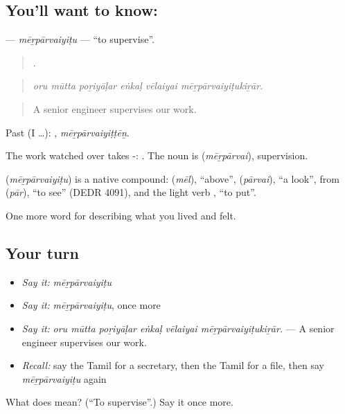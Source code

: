 \subsection*{You'll want to know: }
\textbf{} — \emph{mēṟpārvaiyiṭu} — \textquotedblleft{}to supervise\textquotedblright{}.

\begin{quote}
     .
\end{quote}

\begin{quote}
\emph{oru mūtta poṟiyāḷar eṅkaḷ vēlaiyai mēṟpārvaiyiṭukiṟār.}
\end{quote}

\begin{quote}
A senior engineer supervises our work.
\end{quote}

Past (I …): , \emph{mēṟpārvaiyiṭṭēṉ}.

The work watched over takes -:  . The noun is  (\emph{mēṟpārvai}), supervision.

\begin{cousinweb}
\textbf{} (\emph{mēṟpārvaiyiṭu}) is a native compound:  (\emph{mēl}), \textquotedblleft{}above\textquotedblright{},  (\emph{pārvai}), \textquotedblleft{}a look\textquotedblright{}, from  (\emph{pār}), \textquotedblleft{}to see\textquotedblright{} (DEDR 4091), and the light verb , \textquotedblleft{}to put\textquotedblright{}.
\end{cousinweb}

\begin{grammarlens}[title={What you've built}]
One more word for describing what you lived and felt.
\end{grammarlens}

\subsection*{Your turn}
\begin{itemize}
\raggedright
  \item \emph{Say it:} \emph{mēṟpārvaiyiṭu}
  \item \emph{Say it:} \emph{mēṟpārvaiyiṭu}, once more
  \item \emph{Say it:} \emph{oru mūtta poṟiyāḷar eṅkaḷ vēlaiyai mēṟpārvaiyiṭukiṟār.} — A senior engineer supervises our work.
  \item \emph{Recall:} say the Tamil for a secretary, then the Tamil for a file, then say \emph{mēṟpārvaiyiṭu} again
\end{itemize}

\begin{tcolorbox}[breakable,colback=teal!4,colframe=teal!35!black,title={Before you move on}]
What does  mean? (\textquotedblleft{}To supervise\textquotedblright{}.) Say it once more.
\end{tcolorbox}
